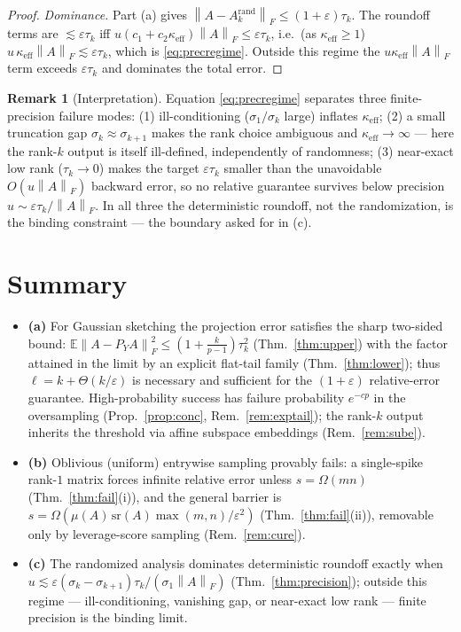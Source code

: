 \documentclass{amsart}
\theoremstyle{definition}
\newtheorem{remark}{Remark}
\newcommand{\Frob}[1]{\left\lVert #1\right\rVert_F}
\newcommand{\E}{\mathbb{E}}
\begin{document}
\begin{proof}
\emph{Dominance.} Part (a) gives $\Frob{A-A_k^{\mathrm{rand}}}\le(1+\varepsilon)\tau_k$.
The roundoff terms are $\lesssim\varepsilon\tau_k$ iff
$u(c_1+c_2\kappa_{\mathrm{eff}})\Frob{A}\le\varepsilon\tau_k$, i.e.\ (as
$\kappa_{\mathrm{eff}}\ge1$) $u\,\kappa_{\mathrm{eff}}\Frob{A}\lesssim\varepsilon\tau_k$,
which is \eqref{eq:precregime}. Outside this regime the
$u\kappa_{\mathrm{eff}}\Frob{A}$ term exceeds $\varepsilon\tau_k$ and dominates
the total error.
\end{proof}

\begin{remark}[Interpretation]
Equation \eqref{eq:precregime} separates three finite-precision failure modes:
(1) ill-conditioning ($\sigma_1/\sigma_k$ large) inflates $\kappa_{\mathrm{eff}}$;
(2) a small truncation gap $\sigma_k\approx\sigma_{k+1}$ makes the rank choice
ambiguous and $\kappa_{\mathrm{eff}}\to\infty$ --- here the rank-$k$ output is
itself ill-defined, independently of randomness; (3) near-exact low rank
($\tau_k\to0$) makes the target $\varepsilon\tau_k$ smaller than the unavoidable
$O(u\Frob{A})$ backward error, so no relative guarantee survives below precision
$u\sim\varepsilon\tau_k/\Frob{A}$. In all three the deterministic roundoff, not
the randomization, is the binding constraint --- the boundary asked for in (c).
\end{remark}

\section{Summary}

\begin{itemize}
\item \textbf{(a)} For Gaussian sketching the projection error satisfies the
sharp two-sided bound: $\E\Frob{A-P_YA}^2\le(1+\tfrac{k}{p-1})\tau_k^2$
(Thm.~\ref{thm:upper}) with the factor attained in the limit by an explicit
flat-tail family (Thm.~\ref{thm:lower}); thus $\ell=k+\Theta(k/\varepsilon)$ is
necessary and sufficient for the $(1+\varepsilon)$ relative-error guarantee.
High-probability success has failure probability
$e^{-cp}$ in the oversampling (Prop.~\ref{prop:conc}, Rem.~\ref{rem:exptail});
the rank-$k$ output inherits the threshold via affine subspace embeddings
(Rem.~\ref{rem:sube}).
\item \textbf{(b)} Oblivious (uniform) entrywise sampling provably fails: a
single-spike rank-$1$ matrix forces infinite relative error unless
$s=\Omega(mn)$ (Thm.~\ref{thm:fail}(i)), and the general barrier is
$s=\Omega(\mu(A)\,\mathrm{sr}(A)\max(m,n)/\varepsilon^2)$ (Thm.~\ref{thm:fail}(ii)),
removable only by leverage-score sampling (Rem.~\ref{rem:cure}).
\item \textbf{(c)} The randomized analysis dominates deterministic roundoff
exactly when $u\lesssim\varepsilon(\sigma_k-\sigma_{k+1})\tau_k/(\sigma_1\Frob{A})$
(Thm.~\ref{thm:precision}); outside this regime --- ill-conditioning, vanishing
gap, or near-exact low rank --- finite precision is the binding limit.
\end{itemize}
\end{document}
